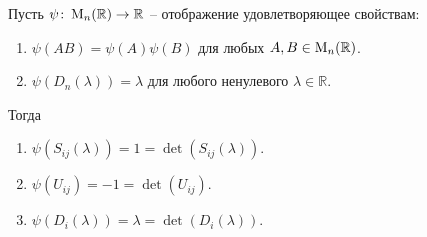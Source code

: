 \begin{claim}
\label{claim::MultiOnElementary}
Пусть $\psi\colon \operatorname{M}_{n}(\mathbb R)\to \mathbb R$ -- отображение удовлетворяющее свойствам:
\begin{enumerate}
\item $\psi(AB) = \psi(A)\psi(B)$ для любых $A,B\in\operatorname{M}_{n}(\mathbb R)$.

\item $\psi(D_n(\lambda)) = \lambda$ для любого ненулевого $\lambda\in\mathbb R$.
\end{enumerate}
Тогда
\begin{enumerate}
\item $\psi(S_{ij}(\lambda)) = 1 = \det(S_{ij}(\lambda))$.

\item $\psi(U_{ij}) = -1 = \det(U_{ij})$.

\item $\psi(D_i(\lambda)) = \lambda = \det(D_i(\lambda))$.
\end{enumerate}
\end{claim}
